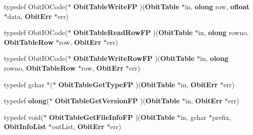 \begin{CompactItemize}
typedef Obit\-IOCode($\ast$ {\bf Obit\-Table\-Write\-FP} )({\bf Obit\-Table} $\ast$in, {\bf olong} row, {\bf ofloat} $\ast$data, {\bf Obit\-Err} $\ast$err)
\item 
typedef Obit\-IOCode($\ast$ {\bf Obit\-Table\-Read\-Row\-FP} )({\bf Obit\-Table} $\ast$in, {\bf olong} rowno, {\bf Obit\-Table\-Row} $\ast$row, {\bf Obit\-Err} $\ast$err)
\item 
typedef Obit\-IOCode($\ast$ {\bf Obit\-Table\-Write\-Row\-FP} )({\bf Obit\-Table} $\ast$in, {\bf olong} rowno, {\bf Obit\-Table\-Row} $\ast$row, {\bf Obit\-Err} $\ast$err)
\item 
typedef gchar $\ast$($\ast$ {\bf Obit\-Table\-Get\-Type\-FP} )({\bf Obit\-Table} $\ast$in, {\bf Obit\-Err} $\ast$err)
\item 
typedef {\bf olong}($\ast$ {\bf Obit\-Table\-Get\-Version\-FP} )({\bf Obit\-Table} $\ast$in, {\bf Obit\-Err} $\ast$err)
\item 
typedef void($\ast$ {\bf Obit\-Table\-Get\-File\-Info\-FP} )({\bf Obit\-Table} $\ast$in, gchar $\ast$prefix, {\bf Obit\-Info\-List} $\ast$out\-List, {\bf Obit\-Err} $\ast$err)
\end{CompactItemize}
